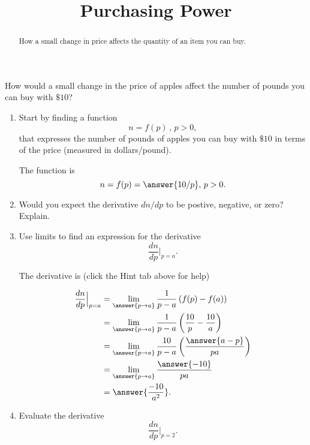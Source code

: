 \documentclass{ximera}
\title{Purchasing Power}
\begin{document}
\begin{abstract}
How a small change in price affects the quantity of an item you can buy.
\end{abstract}
\maketitle


\begin{question} \label{Qdgvvbrtghgygrert}
How would a small change in the price of apples affect the number of pounds you can buy with $\$10$?

\begin{enumerate}

\item Start by finding a function
\[
       n = f(p) \, , \, p>0 ,
\]
that expresses the number of pounds of apples you can buy with $\$10$ in terms of the price (measured in dollars/pound).

The function is
\[
       n = f(p) = \answer{10/p} ,\, p>0.
\]

\item Would you expect the derivative $dn/dp$ to be postive, negative, or zero? Explain.

\item Use limits to find an expression for the derivative
\[
    \frac{dn}{dp} \Big|_{p=a}.
\]

The derivative is (click the Hint tab above for help)

\begin{hint}
\begin{align*}
          \frac{dn}{dp} \Big|_{p=a} &= \lim_{\answer{p\to a}} \frac{1}{p-a} \left( f(p)-f(a) \right)  \\
                                                 &=  \lim_{\answer{p\to a}} \frac{1}{p-a} \left(\frac{10}{p} - \frac{10}{a} \right)  \\
                                                 &=  \lim_{\answer{p\to a}} \frac{10}{p-a} \left(\frac{\answer{a-p}}{pa} \right)  \\
                                                  &=  \lim_{\answer{p\to a}} \frac{\answer{-10}}{pa} \\
                                                  & = \answer{\frac{-10}{a^2}} .
\end{align*}
\end{hint}

\item Evaluate the derivative 
\[
         \frac{dn}{dp} \Big|_{p=2} . 
\]


\end{enumerate}
\end{question}
\end{document}
